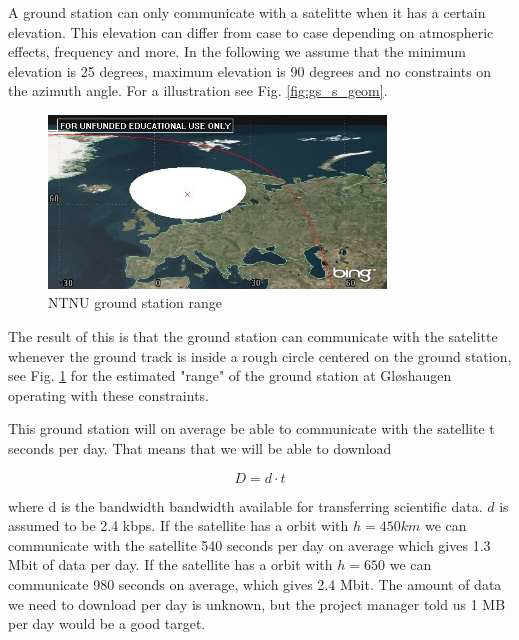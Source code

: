 A ground station can only communicate with a satelitte when it has a certain elevation. This elevation can differ from case to case depending on atmospheric effects, frequency and more. 
In the following we assume that the minimum elevation is 25 degrees, maximum elevation is 90 degrees and no constraints on the azimuth angle.  For a illustration see Fig. \ref{fig:gs_s_geom}.

\begin{figure}
  \begin{center}
    \includegraphics[width=0.8\textwidth]{Figures/ntnu_footprint}
  \end{center}
  \caption[ntnu footprint]{NTNU ground station range}
  \label{fig:ntnu_range}
\end{figure}

The result of this is that the ground station can communicate with the satelitte whenever the ground track is inside a rough circle centered on the ground station, see Fig. \ref{fig:ntnu_range} for the estimated "range" of the ground station at Gløshaugen operating with these constraints.

This ground station will on average be able to communicate with the satellite t seconds per day. That means that we will be able to download

\begin{equation}
D= d \cdot t
\end{equation}

where d is the bandwidth bandwidth available for transferring scientific data. $d$ is assumed to be 2.4 kbps. If the satellite has a orbit with $h=450km$ we can communicate with the satellite 540 seconds per day on average which gives 1.3 Mbit of data per day. If the satellite has a orbit with $h=650$ we can communicate 980 seconds on average, which gives 2.4 Mbit.
The amount of data we need to download per day is unknown, but the project manager told us 1 MB per day would be a good target. 



